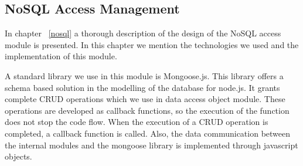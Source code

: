 \subsection{NoSQL Access Management}
In chapter ~\ref{nosql} a thorough description of the design of the NoSQL access module is presented. In this chapter we mention the technologies we used and the implementation of this module. \par
	A standard library we use in this module is Mongoose.js. This library offers  a schema based solution in the modelling of the database for node.js. It grants complete CRUD operations which we use in data access object module. These operations are developed as callback functions, so the execution of the function does not stop the code flow. When the execution of a CRUD operation is completed, a callback function is called. Also, the data communication between the internal modules and the mongoose library is implemented through javascript objects.

